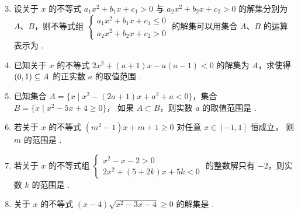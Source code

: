 \documentclass[a4paper,11pt]{article}
\begin{document}


\begin{enumerate}
\setcounter{enumi}{2}

\item 设关于 $x$ 的不等式 $a_1x^2+b_1x+c_1>0$ 与 $a_2x^2+b_2x+c_2>0$ 的解集分别为
$A$、$B$，则不等式组
$\begin{cases}a_1x^2+b_1x+c_1\leqslant0\\ a_2x^2+b_2x+c_2>0\end{cases}$
的解集可以用集合 $A$、$B$ 的运算表示为 \blankline[4.4em].


\item 已知关于 $x$ 的不等式 $2x^2+(a+1)x-a(a-1)<0$ 的解集为 $A$，求使得
$(0,1)\subseteq A$ 的正实数 $a$ 的取值范围 \blankline[4.4em].

\ans{$[3,+\infty)$}

\item 已知集合 $A=\{x\mid x^2-(2a+1)x+a^2+a<0\}$，集合 $B=\{x\mid x^2-5x+4\geqslant0\}$，
如果 $A\subset B$，则实数 $a$ 的取值范围是 \blankline[4.4em].

\ans{$(-\infty,0]\cup[4,+\infty)$}

\item 若关于 $x$ 的不等式 $(m^2-1)x+m+1\geqslant0$ 对任意 $x\in[-1,1]$ 恒成立，
则 $m$ 的范围是 \blankline[4.4em].


\item 若关于 $x$ 的不等式组
$\begin{cases}x^2-x-2>0\\ 2x^2+(5+2k)x+5k<0\end{cases}$
的整数解只有 $-2$，则实数 $k$ 的范围是 \blankline[4.4em].

\ifanswer
\solbegin
{}
\step{综上，实数 $k$ 的取值范围 $[-3,2)$.}
\solend

\fi

\item 关于 $x$ 的不等式 $(x-4)\sqrt{x^2-3x-4}\geqslant0$ 的解集是 \blankline[4.4em].


\end{enumerate}
\end{document}
